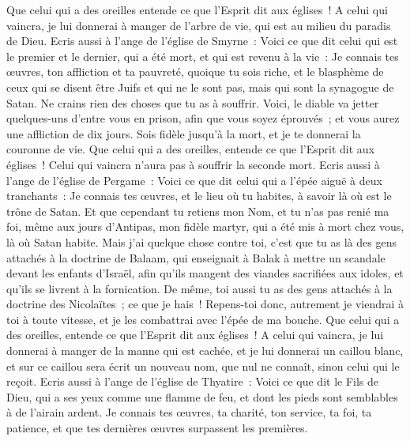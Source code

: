 \begin{multicols}{2}
Que celui qui a des oreilles entende ce que l'Esprit dit aux églises~! A celui qui vaincra, je lui donnerai à manger de l'arbre de vie, qui est au milieu du paradis de Dieu.
Ecris aussi à l'ange de l'église de Smyrne~: Voici ce que dit celui qui est le premier et le dernier, qui a été mort, et qui est revenu à la vie~:
Je connais tes œuvres, ton affliction et ta pauvreté, quoique tu sois riche, et le blasphème de ceux qui se disent être Juifs et qui ne le sont pas, mais qui sont la synagogue de Satan.
Ne crains rien des choses que tu as à souffrir. Voici, le diable va jetter quelques-uns d'entre vous en prison, afin que vous soyez éprouvés~; et vous aurez une affliction de dix jours. Sois fidèle jusqu'à la mort, et je te donnerai la couronne de vie.
Que celui qui a des oreilles, entende ce que l'Esprit dit aux églises~! Celui qui vaincra n'aura pas à souffrir la seconde mort.
Ecris aussi à l'ange de l'église de Pergame~: Voici ce que dit celui qui a l'épée aiguë à deux tranchants~:
Je connais tes œuvres, et le lieu où tu habites, à savoir là où est le trône de Satan. Et que cependant tu retiens mon Nom, et tu n'as pas renié ma foi, même aux jours d'Antipas, mon fidèle martyr, qui a été mis à mort chez vous, là où Satan habite.
Mais j'ai quelque chose contre toi, c'est que tu as là des gens attachés à la doctrine de Balaam, qui enseignait à Balak à mettre un scandale devant les enfants d'Israël, afin qu'ils mangent des viandes sacrifiées aux idoles, et qu'ils se livrent à la fornication.
De même, toi aussi tu as des gens attachés à la doctrine des Nicolaïtes~; ce que je hais~!
Repens-toi donc, autrement je viendrai à toi à toute vitesse, et je les combattrai avec l'épée de ma bouche.
Que celui qui a des oreilles, entende ce que l'Esprit dit aux églises~! A celui qui vaincra, je lui donnerai à manger de la manne qui est cachée, et je lui donnerai un caillou blanc, et sur ce caillou sera écrit un nouveau nom, que nul ne connaît, sinon celui qui le reçoit.
Ecris aussi à l'ange de l'église de Thyatire~: Voici ce que dit le Fils de Dieu, qui a ses yeux comme une flamme de feu, et dont les pieds sont semblables à de l'airain ardent.
Je connais tes œuvres, ta charité, ton service, ta foi, ta patience, et que tes dernières œuvres surpassent les premières.

\end{multicols}
